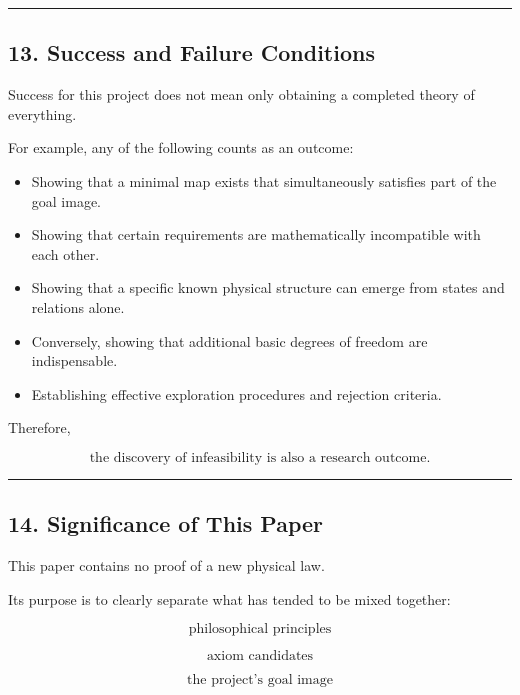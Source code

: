 \documentclass[
  a4paper,
]{article}
\providecommand{\tightlist}{%
  \setlength{\itemsep}{0pt}\setlength{\parskip}{0pt}}
\begin{document}
\begin{center}\rule{0.5\linewidth}{0.5pt}\end{center}

\subsection{13. Success and Failure
Conditions}\label{success-and-failure-conditions}

Success for this project does not mean only obtaining a completed theory
of everything.

For example, any of the following counts as an outcome:

\begin{itemize}
\tightlist
\item
  Showing that a minimal map exists that simultaneously satisfies part
  of the goal image.
\item
  Showing that certain requirements are mathematically incompatible with
  each other.
\item
  Showing that a specific known physical structure can emerge from
  states and relations alone.
\item
  Conversely, showing that additional basic degrees of freedom are
  indispensable.
\item
  Establishing effective exploration procedures and rejection criteria.
\end{itemize}

Therefore,

\[
\boxed{
\text{the discovery of infeasibility is also a research outcome.}
}
\]

\begin{center}\rule{0.5\linewidth}{0.5pt}\end{center}

\subsection{14. Significance of This
Paper}\label{significance-of-this-paper}

This paper contains no proof of a new physical law.

Its purpose is to clearly separate what has tended to be mixed together:

\[
\boxed{
\text{philosophical principles}
}
\]

\[
\boxed{
\text{axiom candidates}
}
\]

\[
\boxed{
\text{the project's goal image}
}
\]
\end{document}
